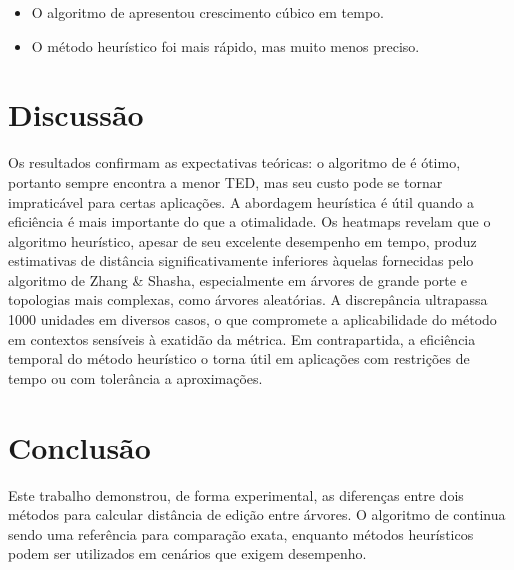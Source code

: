 \documentclass{sbc2023}%
\begin{document}
\begin{itemize}
\item O algoritmo de \cite{doi:10.1137/0218082} apresentou crescimento cúbico em tempo.
\item O método heurístico foi mais rápido, mas muito menos preciso.
\end{itemize}

\section{Discussão}

Os resultados confirmam as expectativas teóricas: o algoritmo de \cite{doi:10.1137/0218082} é ótimo, portanto sempre encontra a menor TED, mas seu custo pode se tornar impraticável para certas aplicações. A abordagem heurística é útil quando a eficiência é mais importante do que a otimalidade. Os heatmaps revelam que o algoritmo heurístico, apesar de seu excelente desempenho em tempo, produz estimativas de distância significativamente inferiores àquelas fornecidas pelo algoritmo de Zhang \& Shasha, especialmente em árvores de grande porte e topologias mais complexas, como árvores aleatórias. A discrepância ultrapassa 1000 unidades em diversos casos, o que compromete a aplicabilidade do método em contextos sensíveis à exatidão da métrica. Em contrapartida, a eficiência temporal do método heurístico o torna útil em aplicações com restrições de tempo ou com tolerância a aproximações.

\section{Conclusão}

Este trabalho demonstrou, de forma experimental, as diferenças entre dois métodos para calcular distância de edição entre árvores. O algoritmo de \cite{doi:10.1137/0218082} continua sendo uma referência para comparação exata, enquanto métodos heurísticos podem ser utilizados em cenários que exigem desempenho.


\end{document}
